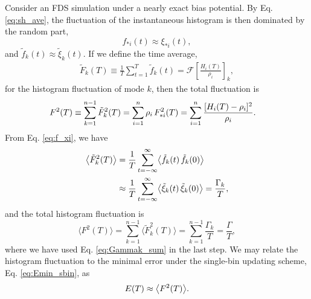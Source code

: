 \documentclass[reprint, superscriptaddress, floatfix]{revtex4-1}
\newcommand{\Err}{E}
\begin{document}
Consider an FDS simulation
under a nearly exact bias potential.
%
By Eq. \eqref{eq:sh_ave},
the fluctuation of the instantaneous histogram
is then dominated by the random part,
%
\begin{equation}
  f_{*i}(t) \approx \xi_{*i}(t)
  ,
  \label{eq:f_xi}
\end{equation}
and
$\tilde f_k(t) \approx \tilde \xi_k(t).$
%
If we define the time average,
%
\begin{align*}
  \tilde F_k(T) \equiv \frac 1 T \sum_{t = 1}^T \tilde f_k(t)
  =\mathcal F\left[ \frac{ H_i(T) } { \rho_i } \right]_k
  ,
\end{align*}
%
for the histogram fluctuation of mode $k$,
then the total fluctuation is
%
\begin{align}
  F^2(T)
  &\equiv
  \sum_{k=1}^{n-1} \tilde F_k^2(T)
  =
  \sum_{i=1}^{n} \rho_i \, F_{*i}^2(T)
  =
  \sum_{i=1}^n
  \frac{ [ H_i(T) -\rho_i]^2 }{\rho_i}
  .
  \notag
\end{align}
%
From Eq. \eqref{eq:f_xi}, we have
%
\begin{align}
  \bigl\langle \tilde F_k^2(T) \bigr\rangle
  &=
  \frac{1}{T}
  \sum_{t=-\infty}^\infty
  \bigl\langle
    \tilde f_k(t) \, \tilde f_k(0)
  \bigr\rangle
  \notag \\
  &\approx
  \frac{1}{T}
  \sum_{t=-\infty}^\infty
  \bigl\langle
    \tilde \xi_k(t) \, \tilde \xi_k(0)
  \bigr\rangle
  =
  \frac{ \Gamma_k } { T }
  ,
  \notag
\end{align}
%
and the total histogram fluctuation is
\begin{equation}
  \bigl\langle F^2(T) \bigr\rangle
  =
  \sum_{k=1}^{n-1}
  \bigl\langle \tilde F_k^2(T) \bigr\rangle
  =
  \sum_{k=1}^{n-1}
  \frac{ \Gamma_k } { T }
  =
  \frac{ \Gamma } { T }
  ,
  \label{eq:F2sum}
\end{equation}
where we have used Eq. \eqref{eq:Gammak_sum}
in the last step.
%
We may relate the histogram fluctuation
to the minimal error under the single-bin updating scheme,
Eq. \eqref{eq:Emin_sbin}, as
\begin{equation}
  \Err(T)
  \approx
  \bigl\langle F^2(T) \bigr\rangle
  .
  \notag
\end{equation}
%
\end{document}

